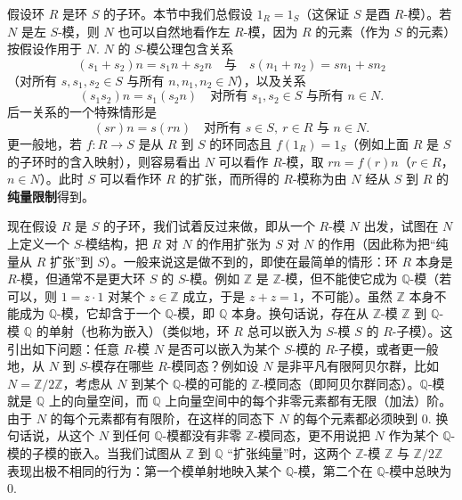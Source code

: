 假设环 \(R\) 是环 \(S\) 的子环。本节中我们总假设 \(1_R = 1_S\)（这保证 \(S\) 是酉 \(R\)-模）。若 \(N\) 是左 \(S\)-模，则 \(N\) 也可以自然地看作左 \(R\)-模，因为 \(R\) 的元素（作为 \(S\) 的元素）按假设作用于 \(N\). \(N\) 的 \(S\)-模公理包含关系
\begin{equation}
(s_1+s_2)n = s_1n+s_2n \quad \text{与} \quad s(n_1+n_2) = sn_1+sn_2 \tag{10.1}
\end{equation}
（对所有 \(s, s_1, s_2 \in S\) 与所有 \(n, n_1, n_2 \in N\)），以及关系
\begin{equation}
(s_1s_2)n = s_1(s_2n) \quad \text{对所有 } s_1, s_2 \in S \text{ 与所有 } n \in N. \tag{10.2}
\end{equation}
后一关系的一个特殊情形是
\begin{equation}
(sr)n = s(rn) \quad \text{对所有 } s \in S,\ r \in R \text{ 与 } n \in N. \tag{10.2′}
\end{equation}
更一般地，若 \(f : R \to S\) 是从 \(R\) 到 \(S\) 的环同态且 \(f(1_R) = 1_S\)（例如上面 \(R\) 是 \(S\) 的子环时的含入映射），则容易看出 \(N\) 可以看作 \(R\)-模，取 \(rn = f(r)n\)（\(r \in R\)，\(n \in N\)）。此时 \(S\) 可以看作环 \(R\) 的扩张，而所得的 \(R\)-模称为由 \(N\) 经从 \(S\) 到 \(R\) 的\textbf{纯量限制}得到。

现在假设 \(R\) 是 \(S\) 的子环，我们试着反过来做，即从一个 \(R\)-模 \(N\) 出发，试图在 \(N\) 上定义一个 \(S\)-模结构，把 \(R\) 对 \(N\) 的作用扩张为 \(S\) 对 \(N\) 的作用（因此称为把“纯量从 \(R\) 扩张”到 \(S\)）。一般来说这是做不到的，即使在最简单的情形：环 \(R\) 本身是 \(R\)-模，但通常不是更大环 \(S\) 的 \(S\)-模。例如 \(\mathbb{Z}\) 是 \(\mathbb{Z}\)-模，但不能使它成为 \(\mathbb{Q}\)-模（若可以，则 \(1 = z \cdot 1\) 对某个 \(z \in \mathbb{Z}\) 成立，于是 \(z+z = 1\)，不可能）。虽然 \(\mathbb{Z}\) 本身不能成为 \(\mathbb{Q}\)-模，它却含于一个 \(\mathbb{Q}\)-模，即 \(\mathbb{Q}\) 本身。换句话说，存在从 \(\mathbb{Z}\)-模 \(\mathbb{Z}\) 到 \(\mathbb{Q}\)-模 \(\mathbb{Q}\) 的单射（也称为嵌入）（类似地，环 \(R\) 总可以嵌入为 \(S\)-模 \(S\) 的 \(R\)-子模）。这引出如下问题：任意 \(R\)-模 \(N\) 是否可以嵌入为某个 \(S\)-模的 \(R\)-子模，或者更一般地，从 \(N\) 到 \(S\)-模存在哪些 \(R\)-模同态？例如设 \(N\) 是非平凡有限阿贝尔群，比如 \(N = \mathbb{Z}/2\mathbb{Z}\)，考虑从 \(N\) 到某个 \(\mathbb{Q}\)-模的可能的 \(\mathbb{Z}\)-模同态（即阿贝尔群同态）。\(\mathbb{Q}\)-模就是 \(\mathbb{Q}\) 上的向量空间，而 \(\mathbb{Q}\) 上向量空间中的每个非零元素都有无限（加法）阶。由于 \(N\) 的每个元素都有有限阶，在这样的同态下 \(N\) 的每个元素都必须映到 0. 换句话说，从这个 \(N\) 到任何 \(\mathbb{Q}\)-模都没有非零 \(\mathbb{Z}\)-模同态，更不用说把 \(N\) 作为某个 \(\mathbb{Q}\)-模的子模的嵌入。当我们试图从 \(\mathbb{Z}\) 到 \(\mathbb{Q}\) “扩张纯量”时，这两个 \(\mathbb{Z}\)-模 \(\mathbb{Z}\) 与 \(\mathbb{Z}/2\mathbb{Z}\) 表现出极不相同的行为：第一个模单射地映入某个 \(\mathbb{Q}\)-模，第二个在 \(\mathbb{Q}\)-模中总映为 0.

